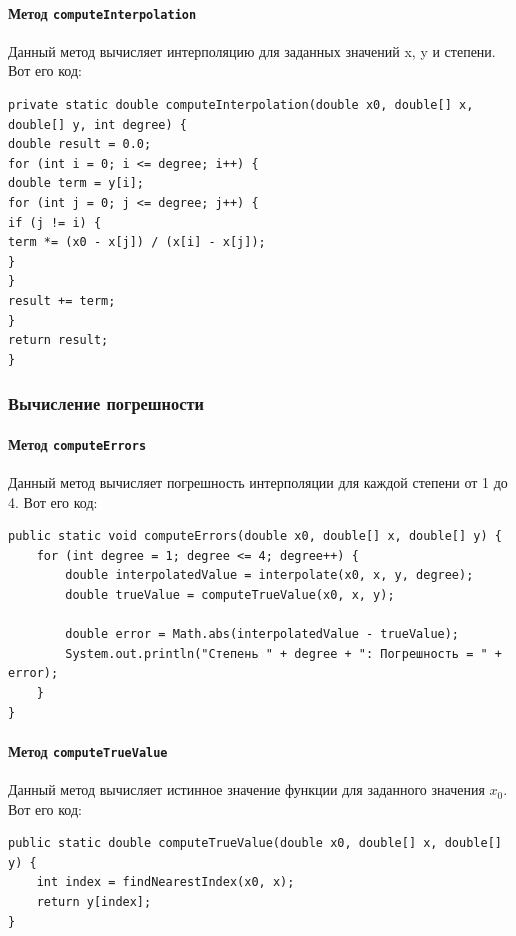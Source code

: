 \documentclass[12pt]{article}
\begin{document}
    \paragraph{Метод \texttt{computeInterpolation}}
    Данный метод вычисляет интерполяцию для заданных значений x, y и степени. Вот его код:

    \begin{verbatim}
private static double computeInterpolation(double x0, double[] x, double[] y, int degree) {
double result = 0.0;
for (int i = 0; i <= degree; i++) {
double term = y[i];
for (int j = 0; j <= degree; j++) {
if (j != i) {
term *= (x0 - x[j]) / (x[i] - x[j]);
}
}
result += term;
}
return result;
}
    \end{verbatim}

    \subsubsection{Вычисление погрешности}

    \paragraph{Метод \texttt{computeErrors}}
    Данный метод вычисляет погрешность интерполяции для каждой степени от 1 до 4. Вот его код:

    \begin{verbatim}
public static void computeErrors(double x0, double[] x, double[] y) {
    for (int degree = 1; degree <= 4; degree++) {
        double interpolatedValue = interpolate(x0, x, y, degree);
        double trueValue = computeTrueValue(x0, x, y);

        double error = Math.abs(interpolatedValue - trueValue);
        System.out.println("Степень " + degree + ": Погрешность = " + error);
    }
}
    \end{verbatim}

    \paragraph{Метод \texttt{computeTrueValue}}
    Данный метод вычисляет истинное значение функции для заданного значения $x_0$. Вот его код:

    \begin{verbatim}
public static double computeTrueValue(double x0, double[] x, double[] y) {
    int index = findNearestIndex(x0, x);
    return y[index];
}
    \end{verbatim}
\end{document}
